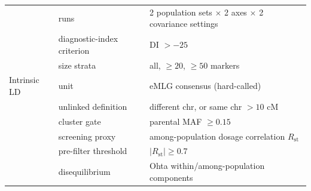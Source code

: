\documentclass[11pt]{article}
\begin{document}
\begin{table}[h]
\begin{tabular}{lll}
 & runs & 2 population sets $\times$ 2 axes $\times$ 2 covariance settings \\
 & diagnostic-index criterion & DI $> -25$ \\
 & size strata & all, $\ge 20$, $\ge 50$ markers \\
\midrule
Intrinsic LD & unit & eMLG consensus (hard-called) \\
 & unlinked definition & different chr, or same chr $> 10$ cM \\
 & cluster gate & parental MAF $\ge 0.15$ \\
 & screening proxy & among-population dosage correlation $R_{\mathrm{st}}$ \\
 & pre-filter threshold & $|R_{\mathrm{st}}| \ge 0.7$ \\
 & disequilibrium & Ohta within/among-population components \\
\bottomrule
\end{tabular}
\end{table}
\end{document}

